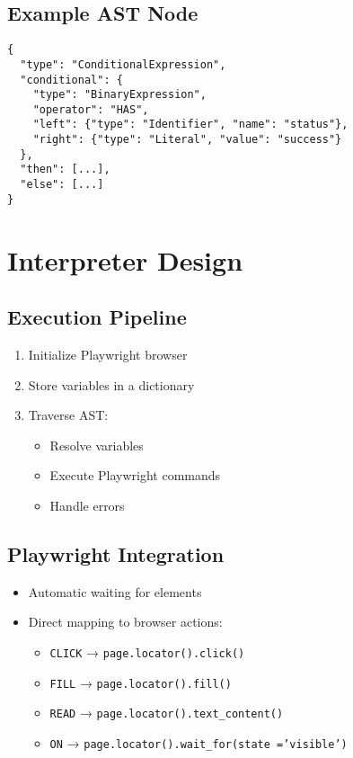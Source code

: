 \documentclass[11pt]{article}
\begin{document}
\subsection{Example AST Node}
\label{sec:orga511641}
\begin{verbatim}
{
  "type": "ConditionalExpression",
  "conditional": {
    "type": "BinaryExpression",
    "operator": "HAS",
    "left": {"type": "Identifier", "name": "status"},
    "right": {"type": "Literal", "value": "success"}
  },
  "then": [...],
  "else": [...]
}
\end{verbatim}
\section{Interpreter Design}
\label{sec:orgece4ac4}

\subsection{Execution Pipeline}
\label{sec:orgf0d1920}
\begin{enumerate}
\item Initialize Playwright browser
\item Store variables in a dictionary
\item Traverse AST:
\begin{itemize}
\item Resolve variables
\item Execute Playwright commands
\item Handle errors
\end{itemize}
\end{enumerate}
\subsection{Playwright Integration}
\label{sec:org00b573e}
\begin{itemize}
\item Automatic waiting for elements
\item Direct mapping to browser actions:
\begin{itemize}
\item \texttt{CLICK} → \texttt{page.locator().click()}
\item \texttt{FILL} → \texttt{page.locator().fill()}
\item \texttt{READ} → \texttt{page.locator().text\_content()}
\item \texttt{ON} → \texttt{page.locator().wait\_for(state ='visible')}
\end{itemize}
\end{itemize}
\end{document}
